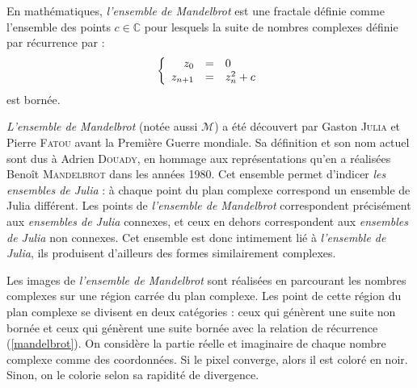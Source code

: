 \begin{itshape}
En mathématiques, \emph{l'ensemble de Mandelbrot} est une fractale définie comme l'ensemble des points $c \in \mathbb{C}$ pour lesquels la suite de nombres complexes définie par récurrence par :
\begin{equation}\label{mandelbrot}
\left\{
\begin{array}{r c l}
z_0 &=& 0\\
z_{n+1} &=& z^2_n+c
\end{array}
\right.
\end{equation}
est bornée.
\setlength{\parskip}{3 mm}

\emph{L'ensemble de Mandelbrot} (notée aussi $\mathcal{M}$) a été découvert par Gaston \textsc{Julia} et Pierre \textsc{Fatou} avant la Première Guerre mondiale. Sa définition et son nom actuel sont dus à Adrien \textsc{Douady}, en hommage aux représentations qu'en a réalisées Benoît \textsc{Mandelbrot} dans les années 1980. Cet ensemble permet d'indicer \emph{les ensembles de Julia} : à chaque point du plan complexe correspond un ensemble de Julia différent. Les points de \emph{l'ensemble de Mandelbrot} correspondent précisément aux \emph{ensembles de Julia} connexes, et ceux en dehors correspondent aux \emph{ensembles de Julia} non connexes. Cet ensemble est donc intimement lié à \emph{l'ensemble de Julia}, ils produisent d'ailleurs des formes similairement complexes.
\setlength{\parskip}{2 mm}

Les images de \emph{l'ensemble de Mandelbrot} sont réalisées en parcourant les nombres complexes sur une région carrée du plan complexe. Les point de cette région du plan complexe se divisent en deux catégories : ceux qui génèrent une suite non bornée et ceux qui génèrent une suite bornée avec la relation de récurrence (\ref{mandelbrot}). On considère la partie réelle et imaginaire de chaque nombre complexe comme des coordonnées. Si le pixel converge, alors il est coloré en noir. Sinon, on le colorie selon sa rapidité de divergence.
\end{itshape}